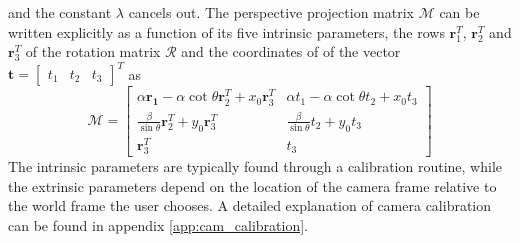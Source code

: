and the constant $\lambda$ cancels out. The perspective projection matrix $\mathcal{M}$ can be written explicitly as a function of its five intrinsic parameters, the rows $\mathbf{r}_1^T$, $\mathbf{r}_2^T$ and $\mathbf{r}_3^T$ of the rotation matrix $\mathcal{R}$ and the coordinates of of the vector $\mathbf{t}=\begin{bmatrix}t_1 & t_2 & t_3\end{bmatrix}^T$ as 
\begin{equation}
    \mathcal{M}=\begin{bmatrix}\alpha\mathbf{r_1}-\alpha\cot{\theta}\mathbf{r}_2^T+x_0\mathbf{r}_3^T & \alpha t_1-\alpha\cot{\theta}t_2+x_0t_3\\ \frac{\beta}{\sin{\theta}}\mathbf{r}_2^T + y_0\mathbf{r}_3^T & \frac{\beta}{\sin{\theta}}t_2+y_0t_3 \\
    \mathbf{r}_3^T & t_3\end{bmatrix}
\end{equation}
The intrinsic parameters are typically found through a calibration routine, while the extrinsic parameters depend on the location of the camera frame relative to the world frame the user chooses. A detailed explanation of camera calibration can be found in appendix \ref{app:cam_calibration}.
